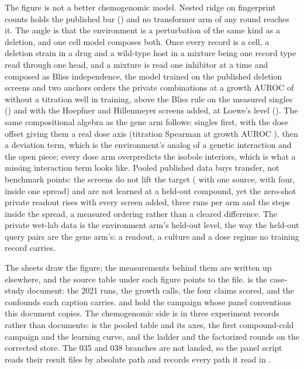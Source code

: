  The figure is not a better chemogenomic model.
Nested ridge on fingerprint counts holds the published bar (\hydladderRidge{}) and no
transformer arm of any round reaches it. The angle is that the environment is a
perturbation of the same kind as a deletion, and one cell model composes both. Once
every record is a cell, a deletion strain in a drug and a wild-type host in a mixture
being one record type read through one head, and a mixture is read one inhibitor at a
time and composed as Bliss independence, the model trained on the published deletion
screens and two anchors orders the \hydnCombinations{} private combinations at a growth
AUROC of \hydrOneZerozsOnegrowthmean{} without a titration well in training, above the
Bliss rule on the measured singles (\hydblissAuroc{}) and \hydrOneZerozsThreegrowthmean{}
with the Hoepfner and Hillenmeyer screens added, at Loewe's level (\hydloeweAuroc{}). The
same compositional algebra as the gene arm follows: singles first, with the dose offset
giving them a real dose axis (titration Spearman \hydrOneZerodosedofftitration{} at
growth AUROC \hydrOneZerodosedoffauroc{}), then a deviation term, which is the
environment's analog of a genetic interaction and the open piece; every dose arm
overpredicts the isobole interiors, which is what a missing interaction term looks like.
Pooled published data buys transfer, not benchmark points: the screens do not lift the
target (\hydrOneZeroonegenemean{} with one source, \hydrOneZerofourgenemean{} with four,
inside one spread) and are not learned at a held-out compound, yet the zero-shot private
readout rises with every screen added, three runs per arm and the steps inside the
spread, a measured ordering rather than a cleared difference. The private wet-lab data is
the environment arm's held-out level, the way the held-out query pairs are the gene arm's:
a readout, a culture and a dose regime no training record carries.

 The sheets draw the figure; the measurements behind
them are written up elsewhere, and the source table under each figure points to the file.
 is the case-study document: the
2021 runs, the growth calls, the four claims scored, and the confounds each caption
carries.  and
 hold the campaign whose panel
conventions this document copies. The chemogenomic side is in three experiment records
rather than documents:  is the pooled table and
its axes,  the first compound-cold
campaign and the learning curve, and
 the ladder and the factorized
rounds on the corrected store. The 035 and 038 branches are not landed, so the panel
script reads their result files by absolute path and records every path it read in
.

